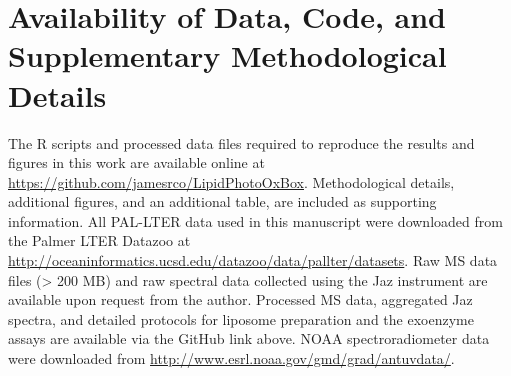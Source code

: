 \section{Availability of Data, Code, and Supplementary Methodological Details}

The R scripts and processed data files required to reproduce the results and figures in this work are available online at \url{https://github.com/jamesrco/LipidPhotoOxBox}. Methodological details, additional figures, and an additional table, are included as supporting information. All PAL-LTER data used in this manuscript were downloaded from the Palmer LTER Datazoo at \url{http://oceaninformatics.ucsd.edu/datazoo/data/pallter/datasets}. Raw MS data files (\textgreater{} 200 MB) and raw spectral data collected using the Jaz instrument are available upon request from the author. Processed MS data, aggregated Jaz spectra, and detailed protocols for liposome preparation and the exoenzyme assays are available via the GitHub link above. NOAA spectroradiometer data were downloaded from \url{http://www.esrl.noaa.gov/gmd/grad/antuvdata/}.
\clearpage

